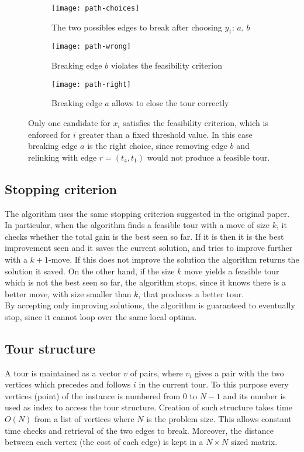 \begin{figure}[h]
	\centering
	\begin{subfigure}[c]{0.31\textwidth}
		\texttt{[image: path-choices]}
		\caption{The two possibles edges to break after choosing $y_1$: $a$, $b$}
	\end{subfigure}
	\begin{subfigure}[c]{0.31\textwidth}
		\texttt{[image: path-wrong]}
		\caption{Breaking edge $b$ violates the feasibility criterion}
	\end{subfigure}
	\begin{subfigure}[c]{0.31\textwidth}
		\texttt{[image: path-right]}
		\caption{Breaking edge $a$ allows to close the tour correctly}
	\end{subfigure}
	\caption{Only one candidate for $x_i$ satisfies the feasibility criterion, which is enforced for $i$ greater than a fixed threshold value. In this case breaking edge $a$ is the right choice, since removing edge $b$ and relinking with edge $r=(t_4,t_1)$ would not produce a feasible tour.}
	\label{fig:feasibility-moves}
\end{figure}

\subsection{Stopping criterion}
The algorithm uses the same stopping criterion suggested in the original paper. In particular, when the algorithm finds a feasible tour with a move of size $k$, it checks whether the total gain is the best seen so far. If it is then it is the best improvement seen and it saves the current solution, and tries to improve further with a $k+1$-move. If this does not improve the solution the algorithm returns the solution it saved. On the other hand, if the size $k$ move yields a feasible tour which is not the best seen so far, the algorithm stops, since it knows there is a better move, with size smaller than $k$, that produces a better tour.\\
By accepting only improving solutions, the algorithm is guaranteed to eventually stop, since it cannot loop over the same local optima.

\subsection{Tour structure}
A tour is maintained as a vector $v$ of pairs, where $v_i$ gives a pair with the two vertices which precedes and follows $i$ in the current tour. To this purpose every vertices (point) of the instance is numbered from $0$ to $N-1$ and its number is used as index to access the tour structure. Creation of such structure takes time $O(N)$ from a list of vertices where $N$ is the problem size. This allows constant time checks and retrieval of the two edges to break. Moreover, the distance between each vertex (the cost of each edge) is kept in a $N\times N$ sized matrix.

